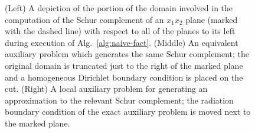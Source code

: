 \begin{figure}
\caption{(Left) A depiction of the portion of the domain involved in the 
computation of the Schur complement of an $x_1 x_2$ plane 
(marked with the dashed line)
with respect to all of the planes to its left during execution of 
Alg.~\ref{alg:naive-fact}. (Middle) An equivalent auxiliary
problem which generates the same Schur complement; the original domain is 
truncated just to the right of the marked plane and a homogeneous Dirichlet 
boundary condition is placed on the cut.
(Right) A local auxiliary problem for generating an approximation to the 
relevant Schur complement; the radiation boundary condition of the exact
auxiliary problem is moved next to the marked plane.}
\label{fig:auxiliary}
\end{figure}
